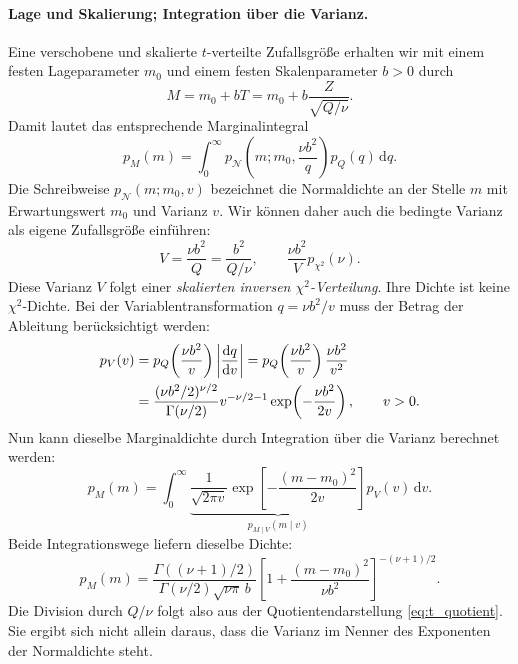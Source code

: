 \paragraph{Lage und Skalierung; Integration über die Varianz.}
Eine verschobene und skalierte $t$-verteilte Zufallsgröße erhalten wir
mit einem festen Lageparameter $m_0$ und einem festen Skalenparameter
$b>0$ durch
\begin{equation}
  M=m_0+bT=m_0+b\frac{Z}{\sqrt{Q/\nu}}.
  \label{eq:t_lage_skala}
\end{equation}
Damit lautet das entsprechende Marginalintegral
\begin{equation}
  p_M(m)=\int_0^\infty
    p_{\mathcal N}\!\left(m;m_0,\frac{\nu b^2}{q}\right)
    p_Q(q)\,\mathrm dq.
  \label{eq:t_skaliertes_marginalintegral}
\end{equation}
Die Schreibweise $p_{\mathcal N}(m;m_0,v)$ bezeichnet die Normaldichte
an der Stelle $m$ mit Erwartungswert $m_0$ und Varianz $v$.
Wir können daher auch die bedingte Varianz als eigene Zufallsgröße
einführen:
\begin{equation}
  V=\frac{\nu b^2}{Q}
    =\frac{b^2}{Q/\nu},
  \qquad
  \frac{\nu b^2}{V}p_{\chi^2}(\nu).
  \label{eq:t_zufaellige_varianz}
\end{equation}
Diese Varianz $V$ folgt einer \textsl{skalierten inversen
$\chi^2$-Verteilung}. Ihre Dichte ist keine $\chi^2$-Dichte.
Bei der Variablentransformation $q=\nu b^2/v$ muss der Betrag der
Ableitung berücksichtigt werden:
\begin{align}
  p_V(v)
  &=p_Q\!\left(\frac{\nu b^2}{v}\right)
    \left|\frac{\mathrm dq}{\mathrm dv}\right|
    =p_Q\!\left(\frac{\nu b^2}{v}\right)\frac{\nu b^2}{v^2}
    \notag\\
  &=\frac{(\nu b^2/2)^{\nu/2}}{\Gamma(\nu/2)}
    v^{-\nu/2-1}
    \exp\!\left(-\frac{\nu b^2}{2v}\right),
    \qquad v>0.
  \label{eq:t_inverse_chi2_dichte}
\end{align}
Nun kann dieselbe Marginaldichte durch Integration über die Varianz
berechnet werden:
\begin{equation}
  p_M(m)=\int_0^\infty
    \underbrace{\frac{1}{\sqrt{2\pi v}}
      \exp\!\left[-\frac{(m-m_0)^2}{2v}\right]}
      _{p_{M\mid V}(m\mid v)}
    p_V(v)\,\mathrm dv.
  \label{eq:t_marginalintegral_varianz}
\end{equation}
Beide Integrationswege liefern dieselbe Dichte:
\begin{equation}
  p_M(m)=
  \frac{\Gamma\!\left((\nu+1)/2\right)}
       {\Gamma(\nu/2)\sqrt{\nu\pi}\,b}
  \left[1+\frac{(m-m_0)^2}{\nu b^2}\right]^{-(\nu+1)/2}.
  \label{eq:t_dichte_lage_skala}
\end{equation}
Die Division durch $Q/\nu$ folgt also aus der Quotientendarstellung
\eqref{eq:t_quotient}. Sie ergibt sich nicht allein daraus, dass die
Varianz im Nenner des Exponenten der Normaldichte steht.


